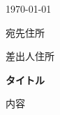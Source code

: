 \documentclass[a4paper]{jsarticle}
\newcommand{\issueDate}{\today}
\newcommand{\heading}{タイトル}
\newcommand{\toAddress}{宛先住所}
\newcommand{\fromAddress}{差出人住所}
\newcommand{\contents}{内容}
\begin{document}
\begin{flushright}\issueDate\end{flushright}
\begin{flushleft}\toAddress\end{flushleft}
\begin{flushright}\fromAddress\end{flushright}
\vspace{25pt}
\begin{center}\bfseries\Large\heading\end{center}
\vspace{25pt}
\par
\contents
\end{document}
